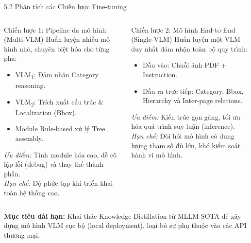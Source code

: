 \documentclass[aspectratio=1610,8pt]{beamer}
\begin{document}
\begin{frame}{5.2 \; Phân tích các Chiến lược Fine-tuning}
    \begin{columns}[T]
        \begin{block}{Chiến lược 1: Pipeline đa mô hình (Multi-VLM)}
            Huấn luyện nhiều mô hình nhỏ, chuyên biệt hóa cho từng pha:
            \begin{itemize}
                \item VLM\textsubscript{1}: Đảm nhận Category reasoning.
                \item VLM\textsubscript{2}: Trích xuất cấu trúc \& Localization (Bbox).
                \item Module Rule-based xử lý Tree assembly.
            \end{itemize}
            \textit{Ưu điểm:} Tính module hóa cao, dễ cô lập lỗi (debug) và thay thế thành phần.\\
            \textit{Hạn chế:} Độ phức tạp khi triển khai toàn hệ thống cao.
        \end{block}

        \begin{block}{Chiến lược 2: Mô hình End-to-End (Single-VLM)}
            Huấn luyện một VLM duy nhất đảm nhận toàn bộ quy trình:
            \begin{itemize}
                \item Đầu vào: Chuỗi ảnh PDF + Instruction.
                \item Đầu ra trực tiếp: Category, Bbox, Hierarchy và Inter-page relations.
            \end{itemize}
            \textit{Ưu điểm:} Kiến trúc gọn gàng, tối ưu hóa quá trình suy luận (inference).\\
            \textit{Hạn chế:} Đòi hỏi mô hình có dung lượng tham số đủ lớn, khó kiểm soát hành vi mô hình.
        \end{block}
    \end{columns}

    \vspace{0.5em}
    \begin{center}
        \textbf{Mục tiêu dài hạn:} Khai thác Knowledge Distillation từ MLLM SOTA để xây dựng mô hình VLM cục bộ (local deployment), loại bỏ sự phụ thuộc vào các API thương mại.
    \end{center}
\end{frame}
\end{document}
